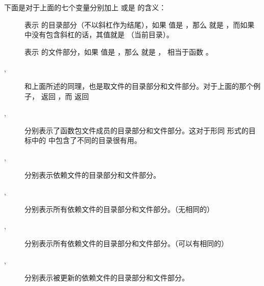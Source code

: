 \documentclass[a4paper,10pt]{sphinxmanual}
\begin{document}
下面是对于上面的七个变量分别加上  或是  的含义：
\begin{description}
\item[{}] \leavevmode
表示  的目录部分（不以斜杠作为结尾），如果  值是  ，那么
 就是  ，而如果  中没有包含斜杠的话，其值就是  （当前目录）。

\item[{}] \leavevmode
表示  的文件部分，如果  值是  ，那么  就是  ，
 相当于函数  。

\item[{, }] \leavevmode
和上面所述的同理，也是取文件的目录部分和文件部分。对于上面的那个例子，  返回  ，而  返回 

\item[{, }] \leavevmode
分别表示了函数包文件成员的目录部分和文件部分。这对于形同  形式的目标中的
 中包含了不同的目录很有用。

\item[{, }] \leavevmode
分别表示依赖文件的目录部分和文件部分。

\item[{, }] \leavevmode
分别表示所有依赖文件的目录部分和文件部分。（无相同的）

\item[{, }] \leavevmode
分别表示所有依赖文件的目录部分和文件部分。（可以有相同的）

\item[{, }] \leavevmode
分别表示被更新的依赖文件的目录部分和文件部分。

\end{description}
\end{document}

